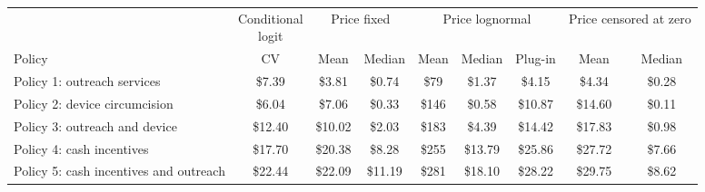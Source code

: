 \begin{tabular}{>{\raggedright\arraybackslash}p{2.7cm}cccccccc}
\toprule
& \makecell{Conditional\\logit} & \multicolumn{2}{c}{Price fixed} & \multicolumn{3}{c}{Price lognormal} & \multicolumn{2}{c}{Price censored at zero} \\
\cmidrule(lr){3-4}\cmidrule(lr){5-7}\cmidrule(lr){8-9}
Policy & CV & Mean & Median & Mean & Median & Plug-in & Mean & Median
\\
\midrule
Policy 1: outreach services & \$7.39 & \$3.81 & \$0.74 & \$79 & \$1.37 & \$4.15 & \$4.34 & \$0.28 \\
Policy 2: device circumcision & \$6.04 & \$7.06 & \$0.33 & \$146 & \$0.58 & \$10.87 & \$14.60 & \$0.11 \\
Policy 3: outreach and device & \$12.40 & \$10.02 & \$2.03 & \$183 & \$4.39 & \$14.42 & \$17.83 & \$0.98 \\
Policy 4: cash incentives & \$17.70 & \$20.38 & \$8.28 & \$255 & \$13.79 & \$25.86 & \$27.72 & \$7.66 \\
Policy 5: cash incentives and outreach & \$22.44 & \$22.09 & \$11.19 & \$281 & \$18.10 & \$28.22 & \$29.75 & \$8.62 \\
\bottomrule
\end{tabular}
